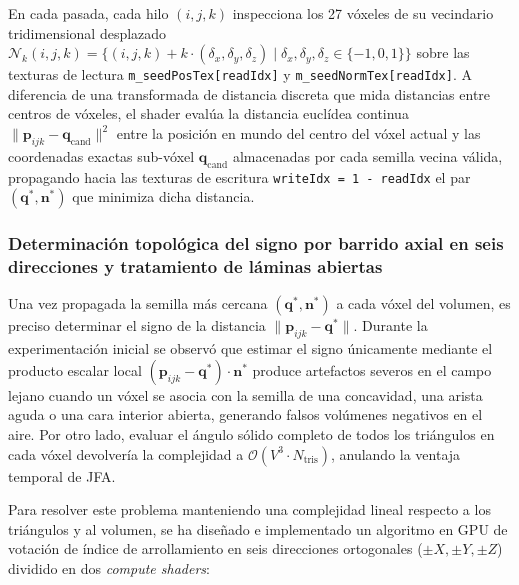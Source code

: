 En cada pasada, cada hilo $(i, j, k)$ inspecciona los 27 vóxeles de su vecindario tridimensional desplazado $\mathcal{N}_k(i, j, k) = \{ (i, j, k) + k \cdot (\delta_x, \delta_y, \delta_z) \mid \delta_x, \delta_y, \delta_z \in \{-1, 0, 1\} \}$ sobre las texturas de lectura \texttt{m\_seedPosTex[readIdx]} y \texttt{m\_seedNormTex[readIdx]}. A diferencia de una transformada de distancia discreta que mida distancias entre centros de vóxeles, el shader evalúa la distancia euclídea continua $\|\mathbf{p}_{ijk} - \mathbf{q}_{\text{cand}}\|^2$ entre la posición en mundo del centro del vóxel actual y las coordenadas exactas sub-vóxel $\mathbf{q}_{\text{cand}}$ almacenadas por cada semilla vecina válida, propagando hacia las texturas de escritura \texttt{writeIdx = 1 - readIdx} el par $(\mathbf{q}^*, \mathbf{n}^*)$ que minimiza dicha distancia.

\subsubsection{Determinación topológica del signo por barrido axial en seis direcciones y tratamiento de láminas abiertas}

Una vez propagada la semilla más cercana $(\mathbf{q}^*, \mathbf{n}^*)$ a cada vóxel del volumen, es preciso determinar el signo de la distancia $\|\mathbf{p}_{ijk} - \mathbf{q}^*\|$. Durante la experimentación inicial se observó que estimar el signo únicamente mediante el producto escalar local $(\mathbf{p}_{ijk} - \mathbf{q}^*) \cdot \mathbf{n}^*$ produce artefactos severos en el campo lejano cuando un vóxel se asocia con la semilla de una concavidad, una arista aguda o una cara interior abierta, generando falsos volúmenes negativos en el aire. Por otro lado, evaluar el ángulo sólido completo de todos los triángulos en cada vóxel devolvería la complejidad a $\mathcal{O}(V^3 \cdot N_{\text{tris}})$, anulando la ventaja temporal de JFA.

Para resolver este problema manteniendo una complejidad lineal respecto a los triángulos y al volumen, se ha diseñado e implementado un algoritmo en GPU de votación de índice de arrollamiento en seis direcciones ortogonales ($\pm X, \pm Y, \pm Z$) dividido en dos \textit{compute shaders}:

